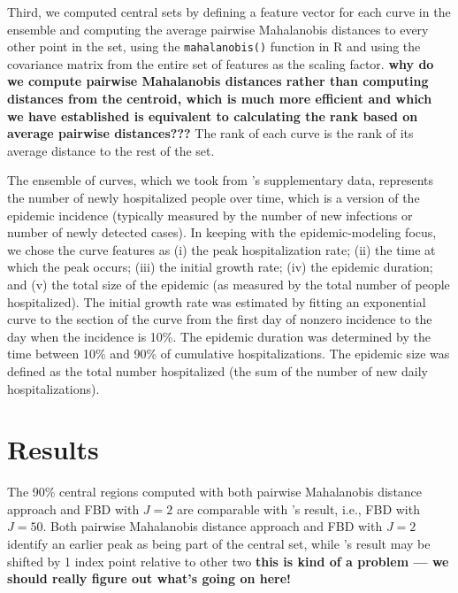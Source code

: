 \documentclass[fleqn,10pt,lineno]{wlpeerj}
\begin{document}
Third, we computed central sets by defining a feature vector for each curve in the ensemble and computing the average pairwise Mahalanobis distances to every other point in the set, using the {\tt mahalanobis()} function in R and using the covariance matrix from the entire  set of features as the scaling factor. \textbf{why do we compute pairwise Mahalanobis distances rather than computing distances from the centroid, which is much more efficient and which we have established is equivalent to calculating the rank based on average pairwise distances???} The rank of each curve is the rank of its average distance to the rest of the set.

The ensemble of curves, which we took from \cite{juul2021fixed}'s supplementary data, represents the number of newly hospitalized people over time, which is a version of the epidemic incidence (typically measured by the number of new infections or number of newly detected cases).
In keeping with the epidemic-modeling focus, we chose the curve features as (i) the peak
hospitalization rate; (ii) the time at which the peak occurs; (iii) the initial growth rate; (iv) the epidemic duration; and (v) the total size of the epidemic (as measured by the total number of people hospitalized). The initial growth rate was estimated by fitting an exponential curve to the section of the curve from the first day of nonzero incidence to the day when the incidence is 10\%. The epidemic duration was determined by the time between 10\% and 90\% of cumulative hospitalizations. The epidemic size was defined as the total number hospitalized (the sum of the number of new daily hospitalizations).

\section*{Results}

The 90\% central regions computed with both pairwise Mahalanobis distance approach and FBD with $J=2$ are comparable with \juul's result, i.e., FBD with $J=50$. Both pairwise Mahalanobis distance approach and FBD with $J=2$ identify an earlier peak as being part of the central set, while \juul's result may be shifted by 1 index point relative to other two \textbf{this is kind of a problem --- we should really figure out what's going on here!}
\end{document}
